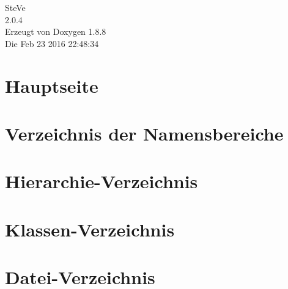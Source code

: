 \documentclass[twoside]{book}
\newcommand{\+}{\discretionary{\mbox{\scriptsize$\hookleftarrow$}}{}{}}
\newcommand{\clearemptydoublepage}{%
  \newpage{\pagestyle{empty}\cleardoublepage}%
}
\begin{document}
\hypersetup{pageanchor=false,
             bookmarks=true,
             bookmarksnumbered=true,
             pdfencoding=unicode
            }
\begin{titlepage}
\vspace*{7cm}
\begin{center}%
{\Large Ste\+Ve \\[1ex]\large 2.\+0.\+4 }\\
\vspace*{1cm}
{\large Erzeugt von Doxygen 1.8.8}\\
\vspace*{0.5cm}
{\small Die Feb 23 2016 22:48:34}\\
\end{center}
\end{titlepage}
\clearemptydoublepage
\tableofcontents
\clearemptydoublepage
{}
\hypersetup{pageanchor=true}

\chapter{Hauptseite}
\label{index}\hypertarget{index}{}
\chapter{Verzeichnis der Namensbereiche}

\chapter{Hierarchie-\/\+Verzeichnis}

\chapter{Klassen-\/\+Verzeichnis}

\chapter{Datei-\/\+Verzeichnis}

\end{document}
